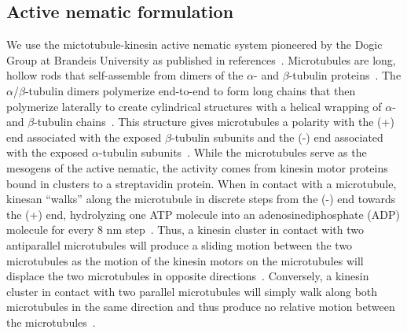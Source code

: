 \subsection{Active nematic formulation}
We use the mictotubule-kinesin active nematic system pioneered by the Dogic Group at Brandeis University as published in references~\cite{RN3,RN27,RN9,RN135,RN134}.
Microtubules are long, hollow rods that self-assemble from dimers of the $\alpha$- and $\beta$-tubulin proteins~\cite{RN248}.
The $\alpha$/$\beta$-tubulin dimers polymerize end-to-end to form long chains that then polymerize laterally to create cylindrical structures with a helical wrapping of $\alpha$- and $\beta$-tubulin chains~\cite{RN248,RN249}.
This structure gives microtubules a polarity with the (+) end associated with the exposed $\beta$-tubulin subunits and the (-) end associated with the exposed $\alpha$-tubulin subunits~\cite{RN248,RN249}.
While the microtubules serve as the mesogens of the active nematic, the activity comes from kinesin motor proteins bound in clusters to a streptavidin protein.
When in contact with a microtubule, kinesan ``walks'' along the microtubule in discrete steps from the (-) end towards the (+) end, hydrolyzing one ATP molecule into an adenosinediphosphate (ADP) molecule for every 8 nm step~\cite{RN250}.
Thus, a kinesin cluster in contact with two antiparallel microtubules will produce a sliding motion between the two microtubules as the motion of the kinesin motors on the microtubules will displace the two microtubules in opposite directions~\cite{RN4,RN3}.
Conversely, a kinesin cluster in contact with two parallel microtubules will simply walk along both microtubules in the same direction and thus produce no relative motion between the microtubules~\cite{RN4,RN3}. \\

